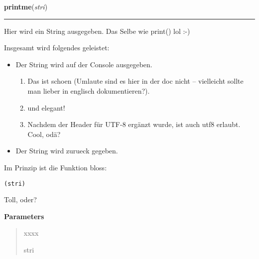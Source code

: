 \hspace{.8\funcindent}\begin{boxedminipage}{\funcwidth}

    \raggedright \textbf{printme}(\textit{stri})

    \vspace{-1.5ex}

    \rule{\textwidth}{0.5\fboxrule}
\setlength{\parskip}{2ex}
    Hier wird ein String ausgegeben. Das Selbe wie print() lol :-)

    Insgesamt wird folgendes geleistet:

    \begin{itemize}
    \setlength{\parskip}{0.6ex}
      \item Der String wird auf der Console ausgegeben.

        \begin{enumerate}

        \setlength{\parskip}{0.5ex}
          \item Das ist schoen (Umlaute sind es hier in der doc nicht -- 
            vielleicht sollte man lieber in englisch dokumentieren?).

          \item und elegant!

          \item Nachdem der Header für UTF-8 ergänzt wurde, ist auch utf8 
            erlaubt. Cool, odä?

        \end{enumerate}

      \item Der String wird zurueck gegeben.

    \end{itemize}

    Im Prinzip ist die Funktion bloss:

\begin{alltt}
\pysrcprompt{{\textgreater}{\textgreater}{\textgreater} } (stri)
\end{alltt}
    Toll, oder?

\setlength{\parskip}{1ex}
      \textbf{Parameters}
      \vspace{-1ex}

      \begin{quote}
        \begin{Ventry}{xxxx}

          \item[stri]


\end{Ventry}
\end{quote}
\end{boxedminipage}
